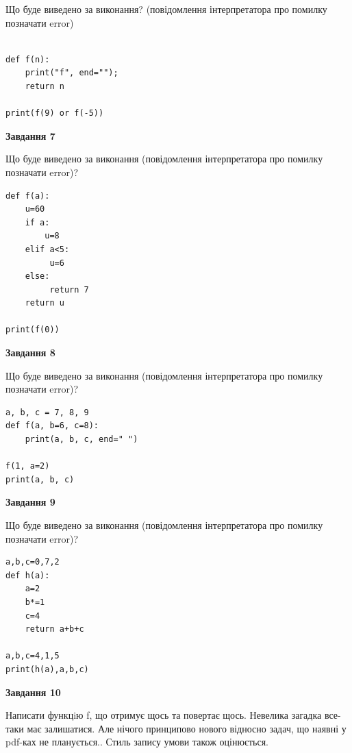 \documentclass[12pt, ukrainian]{article}
\begin{document}
{\begin {large}
Що буде виведено за виконання? (повідомлення інтерпретатора про помилку позначати error)\par
\begin{verbatim}

def f(n):
    print("f", end="");
    return n

print(f(9) or f(-5))
\end{verbatim}

{\begin {center}\textbf{Завдання 7}\end {center}}

Що буде виведено за виконання (повідомлення інтерпретатора про помилку позначати error)?\par
\begin{verbatim}
def f(a):
    u=60
    if a: 
        u=8
    elif a<5:
         u=6
    else:
         return 7
    return u

print(f(0))
\end{verbatim}

{\begin {center}\textbf{Завдання 8}\end {center}}

Що буде виведено за виконання (повідомлення інтерпретатора про помилку позначати error)?\par
\begin{verbatim}
a, b, c = 7, 8, 9
def f(a, b=6, c=8):
    print(a, b, c, end=" ")

f(1, a=2)
print(a, b, c)
\end{verbatim}

{\begin {center}\textbf{Завдання 9}\end {center}}

Що буде виведено за виконання (повідомлення інтерпретатора про помилку позначати error)?\par
\begin{verbatim}
a,b,c=0,7,2
def h(a):
    a=2
    b*=1
    c=4
    return a+b+c

a,b,c=4,1,5
print(h(a),a,b,c)
\end{verbatim}

{\begin {center}\textbf{Завдання 10}\end {center}}


Написати функцiю f, що отримує щось та повертає щось. Невелика загадка все-таки має залишатися. Але нічого принципово нового відносно задач, що наявні у pdf-ках не планується.. Стиль запису умови також оцінюється.\par
\end {large}}
\newpage
\end{document}
